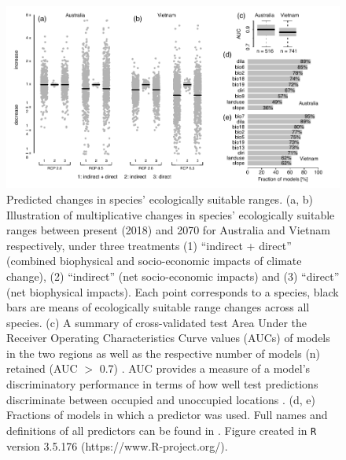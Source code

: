 \begin{figure}[htb]
  \centering
  \includegraphics[width=\textwidth]{chapters/figures/chapter2/fig2.pdf}
  \caption{Predicted changes in species’ ecologically suitable ranges. (a, b) Illustration of multiplicative changes in species’ ecologically suitable ranges between present (2018) and 2070 for Australia and Vietnam respectively, under three treatments (1) “indirect + direct” (combined biophysical and socio-economic impacts of climate change), (2) “indirect” (net socio-economic impacts) and (3) “direct” (net biophysical impacts). Each point corresponds to a species, black bars are means of ecologically suitable range changes across all species. (c) A summary of cross-validated test Area Under the Receiver Operating Characteristics Curve values (AUCs) \citep{jimenez-valverde_insights_2012} of models in the two regions as well as the respective number of models (n) retained (AUC $>$ 0.7) \citep{baldwin_use_2009}. AUC provides a measure of a model’s discriminatory performance in terms of how well test predictions discriminate between occupied and unoccupied locations \citep{jimenez-valverde_insights_2012, baldwin_use_2009}. (d, e) Fractions of models in which a predictor was used. Full names and definitions of all predictors can be found in . Figure created in \texttt{R} version 3.5.176 (https://www.R-project.org/).}
  \label{ch2:fig2}
\end{figure}

